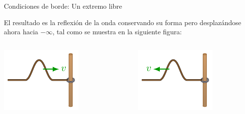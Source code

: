 \documentclass[11pt,handout,aspectratio=1610]{beamer}
\begin{document}
\begin{frame}{Condiciones de borde: Un extremo libre}
    
    El resultado es la reflexión de la onda conservando su forma pero desplazándose ahora hacia $-\infty$, tal como se muestra en la siguiente figura:

    \begin{columns}
        \begin{column}{0.45\textwidth}
            \includegraphics[width=\textwidth]{../figs/waves_reflection_transmission-3.pdf}
        \end{column}
        ~
        \begin{column}{0.45\textwidth}
            \includegraphics[width=\textwidth]{../figs/waves_reflection_transmission-4.pdf}
        \end{column}
    \end{columns}
    
\end{frame}
\end{document}
